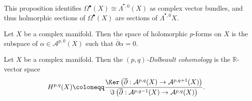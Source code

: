 This proposition identifies $\Omega ^{\bullet} (X) \cong \Lambda ^{^{\bullet},0} (X)$ as complex vector bundles, and thus holmorphic sections of $\Omega ^{\bullet} (X)$ are sections of $\Lambda ^{^{\bullet} ,0} X$.

\begin{proposition}\label{prp:3.2.17}
	Let $X$ be a complex manifold. Then the space of holomorphic $p$-forms on $X$ is the subspace of $\alpha \in\mathcal{A} ^{p,0} (X)$ such that $\overline{\partial } \alpha =0$.
\end{proposition}

\begin{definition}\label{dfn:3.2.18}
	Let $X$ be a complex manifold. Then the \emph{$(p,q)$-Dolbeault cohomology} is the $\mathbb{R} $-vector space
	\[
		H^{p,q} (X)\coloneqq \frac{\Ker \left( \overline{\partial } : \mathcal{A} ^{p,q} (X) \to \mathcal{A} ^{p,q+1} (X) \right) }{\Im \left( \overline{\partial } : \mathcal{A} ^{p,q-1} (X) \to \mathcal{A} ^{p,q} (X) \right) } 
	.\]
\end{definition}

